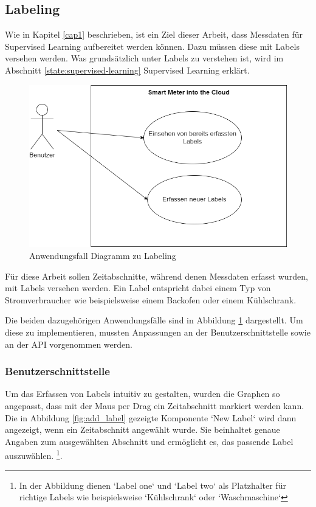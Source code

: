 \subsection{Labeling}
Wie in Kapitel \ref{cap1} beschrieben, ist ein Ziel dieser Arbeit,
dass Messdaten für Supervised Learning aufbereitet werden können.
Dazu müssen diese mit Labels versehen werden.
Was grundsätzlich unter Labels zu verstehen ist, wird im Abschnitt \ref{state:supervised-learning} Supervised Learning erklärt.
\begin{figure}
    \centering
    \includegraphics[width=1.0\textwidth]{gfx/labeling.drawio}
    \caption{Anwendungsfall Diagramm zu Labeling}
    \label{fig:labeling}
\end{figure}
Für diese Arbeit sollen Zeitabschnitte, während denen Messdaten erfasst wurden, mit Labels versehen werden.
Ein Label entspricht dabei einem Typ von Stromverbraucher wie beispielsweise einem Backofen oder einem Kühlschrank.

Die beiden dazugehörigen Anwendungsfälle sind in Abbildung \ref{fig:labeling} dargestellt.
Um diese zu implementieren,
mussten Anpassungen an der Benutzerschnittstelle sowie an der \ac{API} vorgenommen werden.

\subsubsection{Benutzerschnittstelle}
Um das Erfassen von Labels intuitiv zu gestalten,
wurden die Graphen so angepasst, dass mit der Maus per Drag ein Zeitabschnitt markiert werden kann.
Die in Abbildung \ref{fig:add_label} gezeigte Komponente `New Label` wird dann angezeigt, wenn ein Zeitabschnitt angewählt wurde.
Sie beinhaltet genaue Angaben zum ausgewählten Abschnitt
und ermöglicht es, das passende Label auszuwählen. \footnote{
    In der Abbildung dienen `Label one` und `Label two` als Platzhalter für richtige Labels wie beispielsweise `Kühlschrank` oder `Waschmaschine`}.

